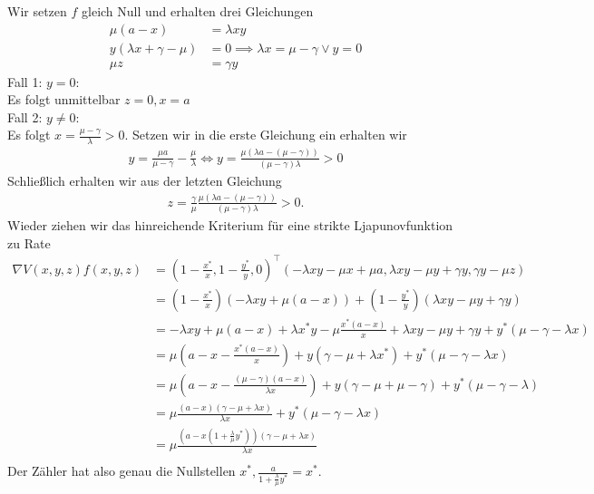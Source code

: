 \begin{solution}
Wir setzen $f$ gleich Null und erhalten drei Gleichungen
\begin{align}
  \mu (a-x) &= \lambda xy \\
  y(\lambda x + \gamma - \mu) &= 0 \implies \lambda x  = \mu - \gamma \lor y = 0\\
  \mu z &= \gamma y \label{3}
\end{align}
Fall 1: $y = 0$: \\
Es folgt unmittelbar $z = 0, x = a$ \\
Fall 2: $y \neq 0$: \\
Es folgt $x = \frac{\mu - \gamma}{\lambda} > 0$. Setzen wir in die erste Gleichung ein
erhalten wir
\begin{align*}
  y = \frac{\mu a}{\mu - \gamma} - \frac{\mu}{\lambda}
  \iff y = \frac{\mu(\lambda a - (\mu - \gamma))}{(\mu - \gamma)\lambda} > 0
\end{align*}
Schließlich erhalten wir aus der letzten Gleichung
\begin{align*}
  z = \frac{\gamma}{\mu} \frac{\mu(\lambda a - (\mu - \gamma))}{(\mu - \gamma)\lambda} > 0.
\end{align*}
Wieder ziehen wir das hinreichende Kriterium für eine strikte Ljapunovfunktion zu Rate
\begin{align*}
  \nabla V(x,y,z)f(x,y,z) &= (1 - \frac{x^*}{x}, 1 - \frac{y^*}{y}, 0)^{\top}
  (- \lambda xy - \mu x + \mu a,\lambda xy - \mu y + \gamma y, \gamma y - \mu z) \\
  &= (1 - \frac{x^*}{x})(- \lambda xy + \mu (a - x)) + (1 - \frac{y^*}{y})(\lambda xy - \mu y + \gamma y) \\
  &= - \lambda xy + \mu (a - x) + \lambda x^*y - \mu \frac{x^*(a-x)}{x} + \lambda xy - \mu y + \gamma y
  + y^*(\mu - \gamma - \lambda x)  \\
  &= \mu (a - x - \frac{x^*(a-x)}{x}) + y(\gamma - \mu + \lambda x^*) + y^*(\mu - \gamma - \lambda x) \\
  &= \mu (a - x - \frac{(\mu - \gamma)(a-x)}{\lambda x}) + y(\gamma - \mu + \mu - \gamma) +
  y^*(\mu - \gamma - \lambda) \\
  &=\mu \frac{(a-x)(\gamma - \mu + \lambda x)}{\lambda x} + y^*(\mu - \gamma - \lambda x) \\
  &= \mu \frac{(a-x(1+\frac{\lambda}{\mu} y^*))(\gamma - \mu + \lambda x)}{\lambda x} \\
\end{align*}
Der Zähler hat also genau die Nullstellen $x^*, \frac{a}{1 + \frac{\lambda}{\mu}y^*} = x^*$.

\end{solution}
